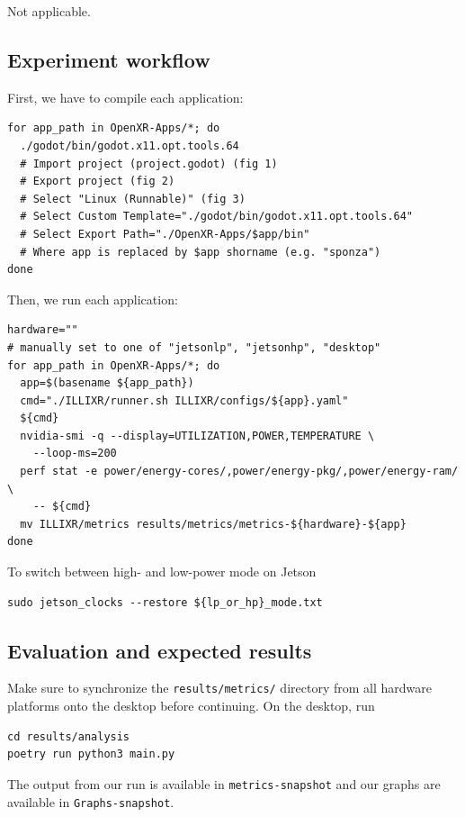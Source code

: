 \documentclass{sigplanconf}
\begin{document}
Not applicable.

\subsection{Experiment workflow}

First, we have to compile each application:

{
\footnotesize
\begin{verbatim}
for app_path in OpenXR-Apps/*; do
  ./godot/bin/godot.x11.opt.tools.64
  # Import project (project.godot) (fig 1)
  # Export project (fig 2)
  # Select "Linux (Runnable)" (fig 3)
  # Select Custom Template="./godot/bin/godot.x11.opt.tools.64"
  # Select Export Path="./OpenXR-Apps/$app/bin"
  # Where app is replaced by $app shorname (e.g. "sponza")
done
\end{verbatim}
}

Then, we run each application:

{\scriptsize
\begin{verbatim}
hardware=""
# manually set to one of "jetsonlp", "jetsonhp", "desktop"
for app_path in OpenXR-Apps/*; do
  app=$(basename ${app_path})
  cmd="./ILLIXR/runner.sh ILLIXR/configs/${app}.yaml"
  ${cmd}
  nvidia-smi -q --display=UTILIZATION,POWER,TEMPERATURE \
    --loop-ms=200
  perf stat -e power/energy-cores/,power/energy-pkg/,power/energy-ram/ \
    -- ${cmd}
  mv ILLIXR/metrics results/metrics/metrics-${hardware}-${app}
done
\end{verbatim}
}

To switch between high- and low-power mode on Jetson

{\small
\begin{verbatim}
sudo jetson_clocks --restore ${lp_or_hp}_mode.txt
\end{verbatim}
}

\subsection{Evaluation and expected results}

Make sure to synchronize the \texttt{results/metrics/} directory from all hardware platforms onto the desktop before continuing. On the desktop, run

{\footnotesize
\begin{verbatim}
cd results/analysis
poetry run python3 main.py
\end{verbatim}
}

The output from our run is available in \texttt{metrics-snapshot} and our graphs are available in \texttt{Graphs-snapshot}.
\end{document}
